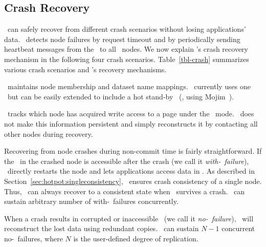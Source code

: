 \subsection{Crash Recovery}
\label{sec:hotpot:recovery}

\hotpot\ can safely recover from different crash scenarios
without losing applications' data.
\hotpot\ detects node failures
by request timeout 
and by periodically sending heartbeat messages from 
the \cd\ to all \hotpot\ nodes.
We now explain \hotpot's crash recovery mechanism
in the following four crash scenarios.
Table~\ref{tbl-crash} summarizes various crash scenarios and \hotpot's recovery mechanisms.




\cd\ maintains node membership and dataset name mappings.
\hotpot\ currently uses one \cd\ but can be easily extended to 
include a hot stand-by \cd\ (\eg, using Mojim~\cite{Zhang15-Mojim}).

\master\ tracks which node has acquired write access to a page under the \mrsw\ mode.
\hotpot\ does not make this information persistent
and simply reconstructs it by contacting all other nodes during recovery.

Recovering from node crashes during non-commit time is fairly straightforward.
If the \nvm\ in the crashed node is accessible after the crash (we call it {\em with-\nvm\ failure}),
\hotpot\ directly restarts the node and
lets applications access data in \nvm.
As described in Section~\ref{sec:hotpot:singleconsistency}, \hotpot\ ensures crash consistency of a single node.
Thus, \hotpot\ can always recover to a consistent state 
when \nvm\ survives a crash.
\hotpot\ can sustain arbitrary number of with-\nvm\ failures concurrently. 

When a crash results in corrupted or inaccessible \nvm\ (we call it {\em no-\nvm\ failure}),
\hotpot\ will reconstruct the lost data using redundant copies.
\hotpot\ can sustain $N-1$ concurrent no-\nvm\ failures, where $N$ is the user-defined degree of replication.

